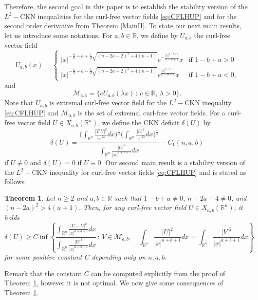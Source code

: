 \documentclass[a4paper,12pt]{article}
\theoremstyle{plain}
\newtheorem{theorem}{Theorem}[section]
\theoremstyle{definition}
\theoremstyle{remark}
\def\R{\mathbb R}%
\def\de{\delta}%
\def\irn{\int_{\R^n}}
\numberwithin{equation}{section}
\begin{document}
Therefore, the second goal in this paper is to establish the stability version of the $L^2-$CKN inequalities for the curl-free vector fields \eqref{eq:CFLHUP} and for the second order derivative from Theorem \ref{MainII}. To state our next main results, let us introduce some notations. For $a, b\in \R$, we define by $U_{a,b}$ the curl-free vector field
\begin{equation*}%
U_{a,b}(x) =
\begin{cases}
|x|^{ -\frac n2 + a  +\frac12 \sqrt{(n-2a -2)^2 + 4(n-1)}} e^{-\frac{|x|^{a -b +1}}{a -b +1}} x &\mbox{if $1-b +a >0$}\\
|x|^{ -\frac n2 + a  -\frac12 \sqrt{(n-2a -2)^2 + 4(n-1)}} e^{\frac{|x|^{a -b +1}}{a -b +1}}x &\mbox{if $1-b +a < 0$,}
\end{cases}
\end{equation*}
and 
\[
\mathcal M_{a,b} =\{ c U_{a,b}(\lambda x)\, :\, c \in \R,\, \lambda >0\}.
\]
Note that $U_{a,b}$ is extremal curl-free vector field for the $L^2-$CKN inequality \eqref{eq:CFLHUP} and $\mathcal M_{a,b}$ is the set of extremal curl-free vector fields. For a curl-free vector field $U\in X_{a,b}(\R^n)$, we define the CKN deficit $\delta(U)$ by
\[
\delta(U) = \frac{\Big(\irn \frac{|\nabla U|^2}{|x|^{2a}} dx\Big)^{\frac12}\Big( \irn \frac{|U|^2}{|x|^{2b}} dx\Big)^{\frac12}}{\irn \frac{|U|^2}{|x|^{a+b+1}} dx} -C_1(n,a,b) 
\]
if $U\not\equiv 0$ and $\de(U) =0$ if $U\equiv 0$. Our second main result is a stability version of the $L^2-$CKN inequality for curl-free vector fields \eqref{eq:CFLHUP} and is stated as follows
\begin{theorem}\label{MainI}
Let $n\geq 2$ and $a,b \in \R$  such that $1-b+ a\not =0$, $n-2a -4\not=0$, and $(n-2a)^2  > 4(n+1)$. Then, for any curl-free vector field $U\in X_{a,b}(\R^n)$, it holds
\begin{equation*}%
\delta(U) \geq C \inf\left\{\frac{\irn \frac{|U - V|^2}{|x|^{a+b+1}} dx}{\irn \frac{|U|^2}{|x|^{a+b+1}} dx}\, :\, V \in \mathcal M_{a,b},\quad \irn \frac{|U|^2}{|x|^{a+b+1}} dx = \irn \frac{|V|^2}{|x|^{a+b+1}} dx\right\}
\end{equation*}
for some positive constant $C$ depending only on $n,a,b$.
\end{theorem}
Remark that the constant $C$ can be computed explicitly from the proof of Theorem \ref{MainI}, however it is not optimal.  We now give some consequences of Theorem \ref{MainI}. 
\end{document}
